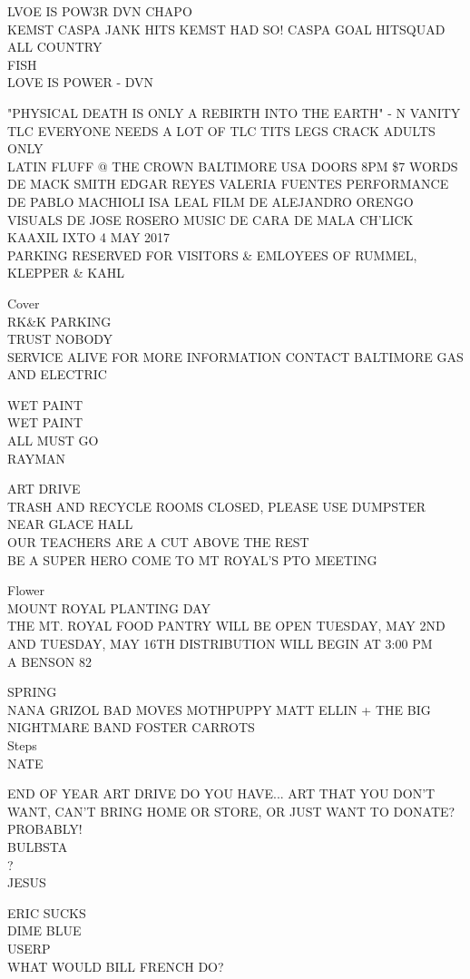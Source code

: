 \documentclass[10pt,letterpaper]{article}
\begin{document}
LVOE IS POW3R DVN CHAPO\\
KEMST CASPA JANK HITS KEMST HAD SO! CASPA GOAL HITSQUAD ALL COUNTRY\\
FISH\\
LOVE IS POWER {-} DVN

"PHYSICAL DEATH IS ONLY A REBIRTH INTO THE EARTH" {-} N VANITY\\
TLC EVERYONE NEEDS A LOT OF TLC TITS LEGS CRACK ADULTS ONLY\\
LATIN FLUFF @ THE CROWN BALTIMORE USA DOORS 8PM \$7 WORDS DE MACK SMITH EDGAR REYES VALERIA FUENTES PERFORMANCE DE PABLO MACHIOLI ISA LEAL FILM DE ALEJANDRO ORENGO VISUALS DE JOSE ROSERO MUSIC DE CARA DE MALA CH'LICK KAAXIL IXTO 4 MAY 2017\\
PARKING RESERVED FOR VISITORS \& EMLOYEES OF RUMMEL, KLEPPER \& KAHL

Cover\\
RK\&K PARKING\\
TRUST NOBODY\\
SERVICE ALIVE FOR MORE INFORMATION CONTACT BALTIMORE GAS AND ELECTRIC

WET PAINT\\
WET PAINT\\
ALL MUST GO\\
RAYMAN

ART DRIVE\\
TRASH AND RECYCLE ROOMS CLOSED, PLEASE USE DUMPSTER NEAR GLACE HALL\\
OUR TEACHERS ARE A CUT ABOVE THE REST\\
BE A SUPER HERO COME TO MT ROYAL'S PTO MEETING

Flower\\
MOUNT ROYAL PLANTING DAY\\
THE MT. ROYAL FOOD PANTRY WILL BE OPEN TUESDAY, MAY 2ND AND TUESDAY, MAY 16TH DISTRIBUTION WILL BEGIN AT 3:00 PM\\
A BENSON 82

SPRING\\
NANA GRIZOL BAD MOVES MOTHPUPPY MATT ELLIN + THE BIG NIGHTMARE BAND FOSTER CARROTS\\
Steps\\
NATE

END OF YEAR ART DRIVE DO YOU HAVE... ART THAT YOU DON'T WANT, CAN'T BRING HOME OR STORE, OR JUST WANT TO DONATE?  PROBABLY!\\
BULBSTA\\
?\\
JESUS

ERIC SUCKS\\
DIME BLUE\\
USERP\\
WHAT WOULD BILL FRENCH DO?
\end{document}
